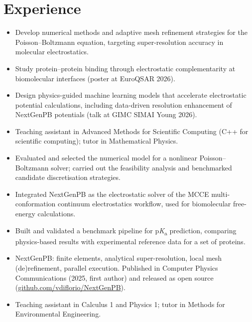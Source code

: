 \documentclass[10pt]{article}
\begin{document}
\section{Experience}
\begin{itemize}
  \item Develop numerical methods and adaptive mesh refinement strategies for the Poisson–Boltzmann equation, targeting super-resolution accuracy in molecular electrostatics.
  \item Study protein–protein binding through electrostatic complementarity at biomolecular interfaces (poster at EuroQSAR 2026).
  \item Design physics-guided machine learning models that accelerate electrostatic potential calculations, including data-driven resolution enhancement of NextGenPB potentials (talk at GIMC SIMAI Young 2026).
  \item Teaching assistant in Advanced Methods for Scientific Computing (C++ for scientific computing); tutor in Mathematical Physics.
\end{itemize}

\begin{itemize}
  \item Evaluated and selected the numerical model for a nonlinear Poisson–Boltzmann solver; carried out the feasibility analysis and benchmarked candidate discretisation strategies.
\end{itemize}

\begin{itemize}
  \item Integrated NextGenPB as the electrostatic solver of the MCCE multi-conformation continuum electrostatics workflow, used for biomolecular free-energy calculations.
  \item Built and validated a benchmark pipeline for p\textit{K}\textsubscript{a} prediction, comparing physics-based results with experimental reference data for a set of proteins.
\end{itemize}

\begin{itemize}
  \item NextGenPB: finite elements, analytical super-resolution, local mesh (de)refinement, parallel execution. Published in Computer Physics Communications (2025, first author) and released as open source (\href{https://github.com/vdiflorio/NextGenPB}{github.com/vdiflorio/NextGenPB}).
  \item Teaching assistant in Calculus 1 and Physics 1; tutor in Methods for Environmental Engineering.
\end{itemize}
\end{document}

